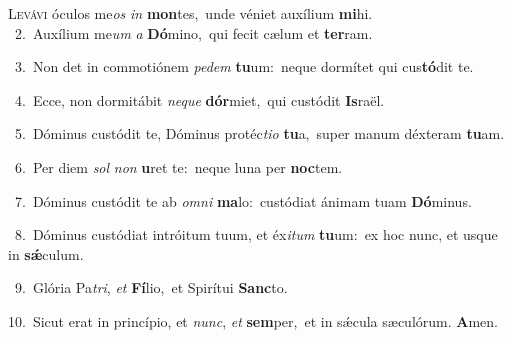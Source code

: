 \lettrine{\initial\textcolor{\initialcolor}{L}}{evávi} óculos me\textit{os} \textit{in} \textbf{mon}\-tes,~\star unde véniet auxílium \textbf{mi}\-hi.\\
{\numbfont\textcolor{\numbcolor}{~2.}}~Auxílium me\textit{um} \textit{a} \textbf{Dó}\-mino,~\star qui fecit cælum et \textbf{ter}\-ram.\par
{\numbfont\textcolor{\numbcolor}{~3.}}~Non det in commotiónem \textit{pe}\-\textit{dem} \textbf{tu}\-um:~\star neque dormítet qui cus\-\textbf{tó}\-dit te.\par
{\numbfont\textcolor{\numbcolor}{~4.}}~Ecce, non dormitábit \textit{ne}\-\textit{que} \textbf{dór}\-miet,~\star qui custódit \textbf{Is}\-raël.\par
{\numbfont\textcolor{\numbcolor}{~5.}}~Dóminus custódit te, Dóminus protéc\-\textit{ti}\-\textit{o} \textbf{tu}\-a,~\star super manum déxteram \textbf{tu}\-am.\par
{\numbfont\textcolor{\numbcolor}{~6.}}~Per diem \textit{sol} \textit{non} \textbf{u}\-ret te:~\star neque luna per \textbf{noc}\-tem.\par
{\numbfont\textcolor{\numbcolor}{~7.}}~Dóminus custódit te ab \textit{om}\-\textit{ni} \textbf{ma}\-lo:~\star custódiat ánimam tuam \textbf{Dó}\-minus.\par
{\numbfont\textcolor{\numbcolor}{~8.}}~Dóminus custódiat intróitum tuum, et éx\-\textit{i}\-\textit{tum} \textbf{tu}\-um:~\star ex hoc nunc, et usque in \textbf{sǽ}\-culum.\par
{\numbfont\textcolor{\numbcolor}{~9.}}~Glória Pa\-\textit{tri}\-, \textit{et} \textbf{Fí}\-lio,~\star et Spirítui \textbf{Sanc}\-to.\par
{\numbfont\textcolor{\numbcolor}{10.}}~Sicut erat in princípio, et \textit{nunc}\-, \textit{et} \textbf{sem}\-per,~\star et in sǽcula sæculórum. \textbf{A}\-men.\par

